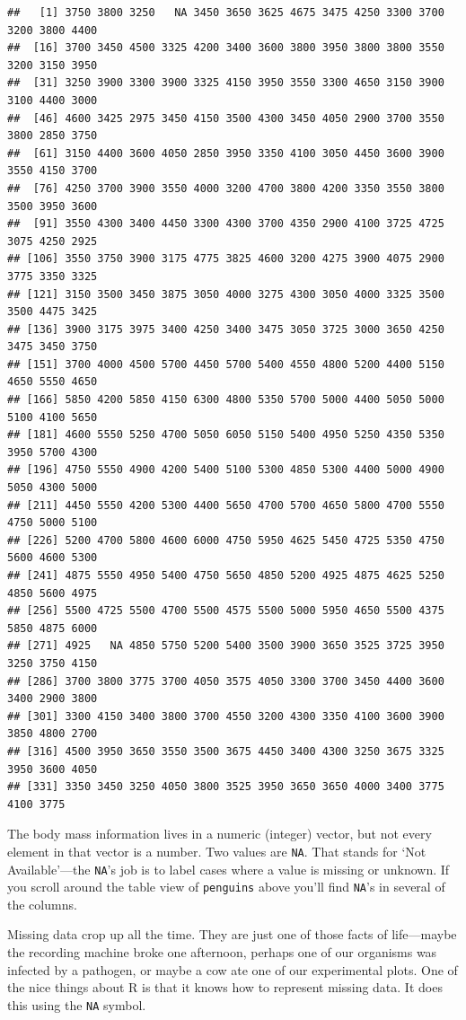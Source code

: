 \documentclass[
]{book}
\begin{document}
\begin{verbatim}
##   [1] 3750 3800 3250   NA 3450 3650 3625 4675 3475 4250 3300 3700 3200 3800 4400
##  [16] 3700 3450 4500 3325 4200 3400 3600 3800 3950 3800 3800 3550 3200 3150 3950
##  [31] 3250 3900 3300 3900 3325 4150 3950 3550 3300 4650 3150 3900 3100 4400 3000
##  [46] 4600 3425 2975 3450 4150 3500 4300 3450 4050 2900 3700 3550 3800 2850 3750
##  [61] 3150 4400 3600 4050 2850 3950 3350 4100 3050 4450 3600 3900 3550 4150 3700
##  [76] 4250 3700 3900 3550 4000 3200 4700 3800 4200 3350 3550 3800 3500 3950 3600
##  [91] 3550 4300 3400 4450 3300 4300 3700 4350 2900 4100 3725 4725 3075 4250 2925
## [106] 3550 3750 3900 3175 4775 3825 4600 3200 4275 3900 4075 2900 3775 3350 3325
## [121] 3150 3500 3450 3875 3050 4000 3275 4300 3050 4000 3325 3500 3500 4475 3425
## [136] 3900 3175 3975 3400 4250 3400 3475 3050 3725 3000 3650 4250 3475 3450 3750
## [151] 3700 4000 4500 5700 4450 5700 5400 4550 4800 5200 4400 5150 4650 5550 4650
## [166] 5850 4200 5850 4150 6300 4800 5350 5700 5000 4400 5050 5000 5100 4100 5650
## [181] 4600 5550 5250 4700 5050 6050 5150 5400 4950 5250 4350 5350 3950 5700 4300
## [196] 4750 5550 4900 4200 5400 5100 5300 4850 5300 4400 5000 4900 5050 4300 5000
## [211] 4450 5550 4200 5300 4400 5650 4700 5700 4650 5800 4700 5550 4750 5000 5100
## [226] 5200 4700 5800 4600 6000 4750 5950 4625 5450 4725 5350 4750 5600 4600 5300
## [241] 4875 5550 4950 5400 4750 5650 4850 5200 4925 4875 4625 5250 4850 5600 4975
## [256] 5500 4725 5500 4700 5500 4575 5500 5000 5950 4650 5500 4375 5850 4875 6000
## [271] 4925   NA 4850 5750 5200 5400 3500 3900 3650 3525 3725 3950 3250 3750 4150
## [286] 3700 3800 3775 3700 4050 3575 4050 3300 3700 3450 4400 3600 3400 2900 3800
## [301] 3300 4150 3400 3800 3700 4550 3200 4300 3350 4100 3600 3900 3850 4800 2700
## [316] 4500 3950 3650 3550 3500 3675 4450 3400 4300 3250 3675 3325 3950 3600 4050
## [331] 3350 3450 3250 4050 3800 3525 3950 3650 3650 4000 3400 3775 4100 3775
\end{verbatim}

The body mass information lives in a numeric (integer) vector, but not every element in that vector is a number. Two values are \texttt{NA}. That stands for `Not Available'---the \texttt{NA}'s job is to label cases where a value is missing or unknown. If you scroll around the table view of \texttt{penguins} above you'll find \texttt{NA}'s in several of the columns.

Missing data crop up all the time. They are just one of those facts of life---maybe the recording machine broke one afternoon, perhaps one of our organisms was infected by a pathogen, or maybe a cow ate one of our experimental plots. One of the nice things about R is that it knows how to represent missing data. It does this using the \texttt{NA} symbol.
\end{document}
